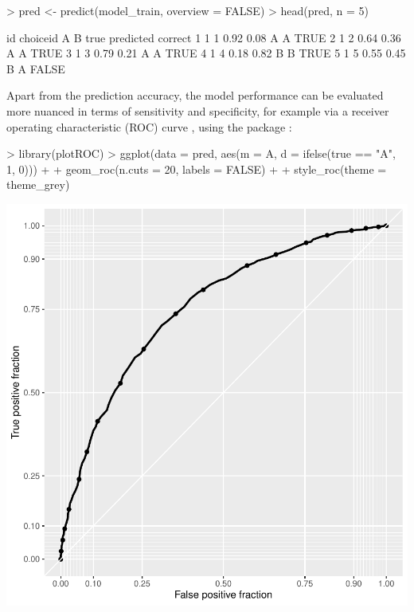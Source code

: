 \documentclass[article,shortnames]{jss}
\begin{document}
\begin{Schunk}
\begin{Sinput}
> pred <- predict(model_train, overview = FALSE)
> head(pred, n = 5)
\end{Sinput}
\begin{Soutput}
  id choiceid    A    B true predicted correct
1  1        1 0.92 0.08    A         A    TRUE
2  1        2 0.64 0.36    A         A    TRUE
3  1        3 0.79 0.21    A         A    TRUE
4  1        4 0.18 0.82    B         B    TRUE
5  1        5 0.55 0.45    B         A   FALSE
\end{Soutput}
\end{Schunk}

Apart from the prediction accuracy, the model performance can be evaluated more nuanced in terms of sensitivity and specificity, for example via a receiver operating characteristic (ROC) curve \citep{Fawcett:2006}, using the  package \citep{Sachs:2017}:

\begin{Schunk}
\begin{Sinput}
> library(plotROC)
> ggplot(data = pred, aes(m = A, d = ifelse(true == "A", 1, 0))) +
+    geom_roc(n.cuts = 20, labels = FALSE) +
+    style_roc(theme = theme_grey)
\end{Sinput}
\end{Schunk}
\includegraphics{rprobitb_oelschlaeger_bauer-roc-example}
\end{document}

